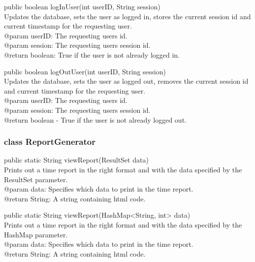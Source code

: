 \documentclass[a4paper]{article}
\begin{document}
\vspace{5mm}
\begin{hangparas}{1.5em}{1}
public boolean logInUser(int userID, String session)\\
Updates the database, sets the user as logged in, stores the current session id and current timestamp for the requesting user.\\
@param userID: The requesting users id.\\
@param session: The requesting users session id.\\
@return boolean: True if the user is not already logged in.
\end{hangparas}

\vspace{5mm}
\begin{hangparas}{1.5em}{1}
public boolean logOutUser(int userID, String session)\\
Updates the database, sets the user as logged out, removes the current session id and current timestamp for the requesting user.\\
@param userID: The requesting users id.\\
@param session: The requesting users session id.\\
@return boolean - True if the user is not already logged out.\\
\end{hangparas}



\subsubsection{class ReportGenerator}

\begin{hangparas}{1.5em}{1}
public static String viewReport(ResultSet data)\\
Prints out a time report in the right format and with the data specified by the ResultSet parameter.\\
@param data: Specifies which data to print in the time report. \\
@return String: A string containing html code.
\end{hangparas}

\begin{hangparas}{1.5em}{1}
public static String viewReport(HashMap<String, int> data)\\
Prints out a time report in the right format and with the data specified by the HashMap parameter.\\
@param data: Specifies which data to print in the time report. \\
@return String: A string containing html code.
\end{hangparas}
\end{document}
